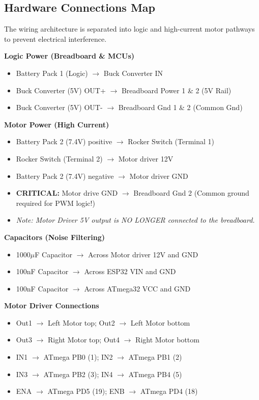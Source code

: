 \documentclass[12pt,a4paper]{article}
\begin{document}
\subsection{Hardware Connections Map}
The wiring architecture is separated into logic and high-current motor pathways to prevent electrical interference.

\textbf{Logic Power (Breadboard \& MCUs)}
\begin{itemize}
    \item Battery Pack 1 (Logic) $\rightarrow$ Buck Converter IN
    \item Buck Converter (5V) OUT+ $\rightarrow$ Breadboard Power 1 \& 2 (5V Rail)
    \item Buck Converter (5V) OUT- $\rightarrow$ Breadboard Gnd 1 \& 2 (Common Gnd)
\end{itemize}

\textbf{Motor Power (High Current)}
\begin{itemize}
    \item Battery Pack 2 (7.4V) positive $\rightarrow$ Rocker Switch (Terminal 1)
    \item Rocker Switch (Terminal 2) $\rightarrow$ Motor driver 12V
    \item Battery Pack 2 (7.4V) negative $\rightarrow$ Motor driver GND
    \item \textbf{CRITICAL:} Motor drive GND $\rightarrow$ Breadboard Gnd 2 (Common ground required for PWM logic!)
    \item \textit{Note: Motor Driver 5V output is NO LONGER connected to the breadboard.}
\end{itemize}

\textbf{Capacitors (Noise Filtering)}
\begin{itemize}
    \item 1000$\mu$F Capacitor $\rightarrow$ Across Motor driver 12V and GND
    \item 100nF Capacitor $\rightarrow$ Across ESP32 VIN and GND
    \item 100nF Capacitor $\rightarrow$ Across ATmega32 VCC and GND
\end{itemize}

\textbf{Motor Driver Connections}
\begin{itemize}
    \item Out1 $\rightarrow$ Left Motor top; Out2 $\rightarrow$ Left Motor bottom
    \item Out3 $\rightarrow$ Right Motor top; Out4 $\rightarrow$ Right Motor bottom
    \item IN1 $\rightarrow$ ATmega PB0 (1); IN2 $\rightarrow$ ATmega PB1 (2)
    \item IN3 $\rightarrow$ ATmega PB2 (3); IN4 $\rightarrow$ ATmega PB4 (5)
    \item ENA $\rightarrow$ ATmega PD5 (19); ENB $\rightarrow$ ATmega PD4 (18)
\end{itemize}
\end{document}
